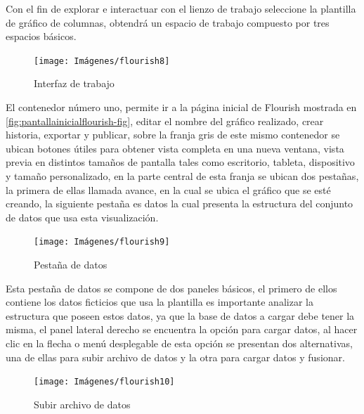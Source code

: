 \documentclass[
]{book}
\begin{document}
Con el fin de explorar e interactuar con el lienzo de trabajo seleccione la plantilla de gráfico de columnas, obtendrá un espacio de trabajo compuesto por tres espacios básicos.

\begin{figure}

{\centering \texttt{[image: Imágenes/flourish8]} 

}

\caption{Interfaz de trabajo}\label{fig:interfazdetrabajoflourish-fig}
\end{figure}

El contenedor número uno, permite ir a la página inicial de Flourish mostrada en \ref{fig:pantallainicialflourish-fig}, editar el nombre del gráfico realizado, crear historia, exportar y publicar, sobre la franja gris de este mismo contenedor se ubican botones útiles para obtener vista completa en una nueva ventana, vista previa en distintos tamaños de pantalla tales como escritorio, tableta, dispositivo y tamaño personalizado, en la parte central de esta franja se ubican dos pestañas, la primera de ellas llamada avance, en la cual se ubica el gráfico que se esté creando, la siguiente pestaña es datos la cual presenta la estructura del conjunto de datos que usa esta visualización.

\begin{figure}

{\centering \texttt{[image: Imágenes/flourish9]} 

}

\caption{Pestaña de datos}\label{fig:pestanadatosflourish-fig}
\end{figure}

Esta pestaña de datos se compone de dos paneles básicos, el primero de ellos contiene los datos ficticios que usa la plantilla es importante analizar la estructura que poseen estos datos, ya que la base de datos a cargar debe tener la misma, el panel lateral derecho se encuentra la opción para cargar datos, al hacer clic en la flecha o menú desplegable de esta opción se presentan dos alternativas, una de ellas para subir archivo de datos y la otra para cargar datos y fusionar.

\begin{figure}

{\centering \texttt{[image: Imágenes/flourish10]} 

}

\caption{Subir archivo de datos}\label{fig:pestanadatossubirdatosflourish-fig}
\end{figure}
\end{document}
